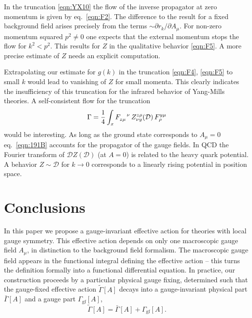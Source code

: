 \documentclass[twocolumn,aps,prd,amsmath,amssymb,preprintnumbers,longbibliography]{revtex4-1}
\numberwithin{equation}{section}
\begin{document}
In the truncation \eqref{eqn:YX10} the flow of the inverse propagator at zero momentum is given by eq.~\eqref{eqn:F2}. The difference to the result for a fixed background field arises precisely from the terms $\sim \partial r_k/\partial A_\mu$. For non-zero momentum squared $p^2 \neq 0$ one expects that the external momentum stops the flow for $k^2 < p^2$. This results for $Z$ in the qualitative behavior \eqref{eqn:F5}. A more precise estimate of $Z$ needs an explicit computation.

Extrapolating our estimate for $g(k)$ in the truncation \eqref{eqn:F4}, \eqref{eqn:F5} to small $k$ would lead to vanishing of $Z$ for small momenta. This clearly indicates the insufficiency of this truncation for the infrared behavior of Yang-Mills theories. A self-consistent flow for the truncation
\begin{equation}\label{eqn:191B}
	\Gamma
	= \frac{1}{4} \int_x \tensor{F}{_z_\mu^\nu} \, Z_{\nu y}^{z \rho}(\mathcal{D}) \, F_\rho^{y \mu}
\end{equation}
would be interesting. As long as the ground state corresponds to $A_\mu = 0$ eq.~\eqref{eqn:191B} accounts for the propagator of the gauge fields. In QCD the Fourier transform of $\mathcal{D} Z(\mathcal{D})$ (at $A = 0$) is related to the heavy quark potential. A behavior $Z \sim \mathcal{D}$ for $k \to 0$ corresponds to a linearly rising potential in position space.



\section{Conclusions}
\label{sec:conclusions}

In this paper we propose a gauge-invariant effective action for theories with local gauge symmetry. This effective action depends on only one macroscopic gauge field $A_\mu$, in distinction to the background field formalism. The macroscopic gauge field appears in the functional integral defining the effective action -- this turns the definition formally into a functional differential equation. In practice, our construction proceeds by a particular physical gauge fixing, determined such that the gauge-fixed effective action $\tilde\Gamma[A]$ decays into a gauge-invariant physical part $\bar\Gamma[A]$ and a gauge part $\Gamma_\text{gf}[A]$,
\begin{equation}\label{eqn:ZA}
	\tilde\Gamma[A]
	= \bar\Gamma[A] + \Gamma_\text{gf}[A].
\end{equation}
\end{document}
